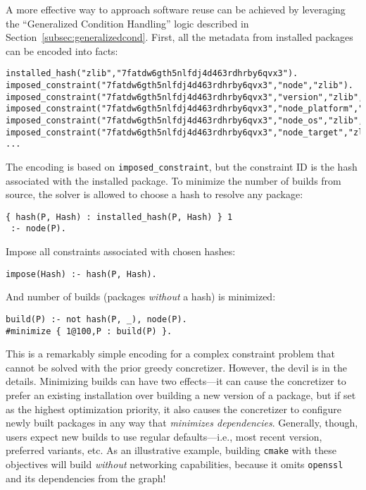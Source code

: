A more effective way to approach software reuse can be achieved by leveraging the
``Generalized Condition Handling'' logic described in
Section~\ref{subsec:generalizedcond}. First, all the metadata from installed packages
can be encoded into facts:
\begin{verbatim}
installed_hash("zlib","7fatdw6gth5nlfdj4d463rdhrby6qvx3").
imposed_constraint("7fatdw6gth5nlfdj4d463rdhrby6qvx3","node","zlib").
imposed_constraint("7fatdw6gth5nlfdj4d463rdhrby6qvx3","version","zlib","1.2.11").
imposed_constraint("7fatdw6gth5nlfdj4d463rdhrby6qvx3","node_platform","zlib","linux").
imposed_constraint("7fatdw6gth5nlfdj4d463rdhrby6qvx3","node_os","zlib","ubuntu20.04").
imposed_constraint("7fatdw6gth5nlfdj4d463rdhrby6qvx3","node_target","zlib","icelake").
...
\end{verbatim}
The encoding is based on \texttt{imposed\_constraint}, but the constraint ID is the
hash associated with the installed package. To minimize the number of builds from
source, the solver is allowed to choose a hash to resolve any package:
\begin{verbatim}
{ hash(P, Hash) : installed_hash(P, Hash) } 1
 :- node(P).
\end{verbatim}
Impose all constraints associated with chosen hashes:
\begin{verbatim}
impose(Hash) :- hash(P, Hash).
\end{verbatim}
And number of builds (packages \emph{without} a hash) is minimized:
\begin{verbatim}
build(P) :- not hash(P, _), node(P).
#minimize { 1@100,P : build(P) }.
\end{verbatim}

This is a remarkably simple encoding for a complex constraint problem that cannot be
solved with the prior greedy concretizer. However, the devil is in the details.
Minimizing builds can have two effects---it can cause the concretizer to prefer an
existing installation over building a new version of a package, but if set as the
highest optimization priority, it also causes the concretizer to configure newly built
packages in any way that {\it minimizes dependencies}. Generally, though, users expect
new builds to use regular defaults---i.e., most recent version, preferred variants, etc.
As an illustrative example, building \texttt{cmake} with these objectives will build
{\it without} networking capabilities, because it omits \texttt{openssl} and its
dependencies from the graph!

